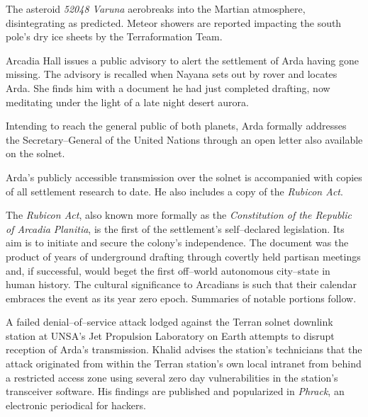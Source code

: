 The asteroid {\it 52048 Varuna} aerobreaks into the Martian atmosphere, disintegrating as predicted. Meteor showers are reported impacting the south pole's dry ice sheets by the Terraformation Team.
\StopTimelineDate

Arcadia Hall issues a public advisory to alert the settlement of Arda having gone missing. The advisory is recalled when Nayana sets out by rover and locates Arda. She finds him with a document he had just completed drafting, now meditating under the light of a late night desert aurora.
\StopTimelineDate


Intending to reach the general public of both planets, Arda formally addresses the Secretary--General of the United Nations through an open letter also available on the solnet.

\startTimelineCorrespondenceDocument
    
\stopTimelineCorrespondenceDocument

Arda's publicly accessible transmission over the solnet is accompanied with copies of all settlement research to date. He also includes a copy of the {\it Rubicon Act}. 

The {\it Rubicon Act}, also known more formally as the {\it Constitution of the Republic of Arcadia Planitia}, is the first of the settlement's self--declared legislation. Its aim is to initiate and secure the colony's independence. The document was the product of years of underground drafting through covertly held partisan meetings and, if successful, would beget the first off--world autonomous city--state in human history. The cultural significance to Arcadians is such that their calendar embraces the event as its year zero epoch. Summaries of notable portions follow.

\startTimelineGeneralDocument
    
\stopTimelineGeneralDocument

A failed denial--of--service attack lodged against the Terran solnet downlink station at UNSA's Jet Propulsion Laboratory on Earth attempts to disrupt reception of Arda's transmission. Khalid advises the station's technicians that the attack originated from within the Terran station's own local intranet from behind a restricted access zone using several zero day vulnerabilities in the station's transceiver software. His findings are published and popularized in {\it Phrack}, an electronic periodical for hackers.

